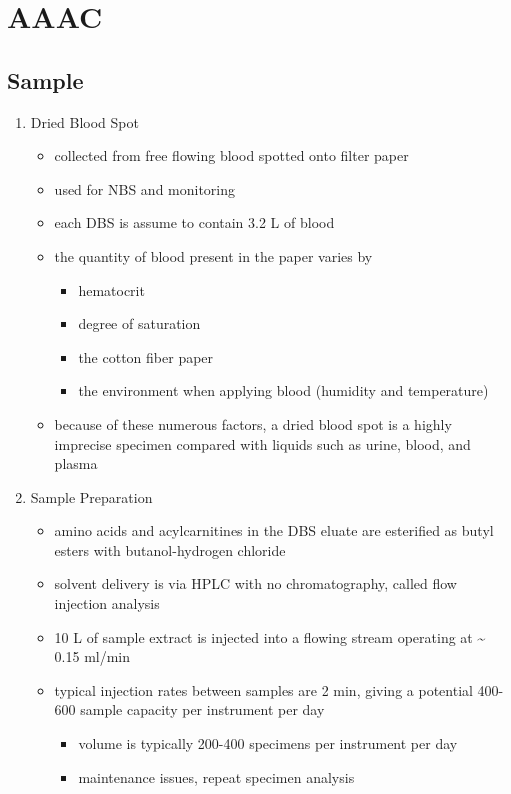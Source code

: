 \documentclass{scrartcl}
\begin{document}
\section{AAAC}
\label{sec:orgd3e0a93}
\subsection{Sample}
\label{sec:orgd5eb83d}
\begin{enumerate}
\item Dried Blood Spot
\label{sec:orgd5d5e14}
\begin{itemize}
\item collected from free flowing blood spotted onto filter paper
\item used for NBS and monitoring
\item each DBS is assume to contain 3.2 \textmu{}L of blood
\item the quantity of blood present in the paper varies by
\begin{itemize}
\item hematocrit
\item degree of saturation
\item the cotton fiber paper
\item the environment  when applying blood (humidity and temperature)
\end{itemize}
\item because of these numerous factors, a dried blood spot is a highly
imprecise specimen compared with liquids such as urine, blood, and plasma
\end{itemize}

\item Sample Preparation
\label{sec:orgc96a1fc}
\begin{itemize}
\item amino acids and acylcarnitines in the DBS eluate are esterified as butyl esters with butanol-hydrogen chloride
\item solvent delivery is via HPLC with no chromatography, called flow injection analysis
\item 10 \textmu{}L of sample extract is injected into a flowing stream operating at \textasciitilde{} 0.15 ml/min

\item typical injection rates between samples are 2 min, giving a
potential 400-600 sample capacity per instrument per day
\begin{itemize}
\item volume is typically 200-400 specimens per instrument per day
\item maintenance issues, repeat specimen analysis
\end{itemize}
\end{itemize}


\end{enumerate}
\end{document}
